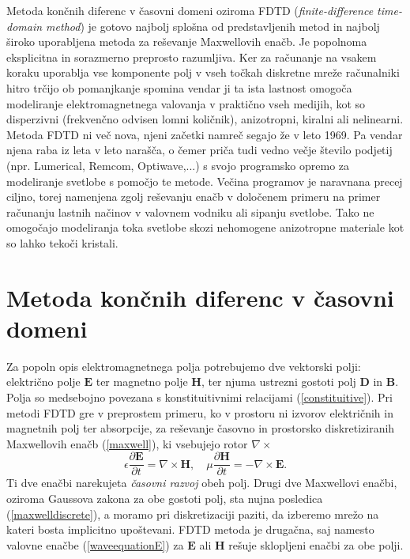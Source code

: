 \documentclass[longbibliography,slovene,a4paper,12pt]{book}
\begin{document}
Metoda končnih diferenc v časovni domeni oziroma FDTD (\emph{finite-difference time-domain method}) je gotovo najbolj splošna od predstavljenih metod in najbolj široko uporabljena metoda za reševanje Maxwellovih enačb. Je popolnoma eksplicitna in sorazmerno preprosto razumljiva. Ker za računanje na vsakem koraku uporablja vse komponente polj v vseh točkah diskretne mreže računalniki hitro trčijo ob pomanjkanje spomina vendar ji ta ista lastnost omogoča modeliranje elektromagnetnega valovanja v praktično vseh medijih, kot so disperzivni (frekvenčno odvisen lomni količnik), anizotropni, kiralni ali nelinearni\cite{gedney}.\\

Metoda FDTD ni več nova, njeni začetki namreč segajo že v leto 1969. Pa vendar njena raba iz leta v leto narašča, o čemer priča tudi vedno večje število podjetij (npr. Lumerical, Remcom, Optiwave,...) s svojo programsko opremo za modeliranje svetlobe s pomočjo te metode\cite{gedney}. Večina programov je naravnana precej ciljno, torej namenjena zgolj reševanju enačb v določenem primeru na primer računanju lastnih načinov v valovnem vodniku ali sipanju svetlobe. Tako ne omogočajo modeliranja toka svetlobe skozi nehomogene anizotropne materiale kot so lahko tekoči kristali.


\section{Metoda končnih diferenc v časovni domeni}

Za popoln opis elektromagnetnega polja potrebujemo dve vektorski polji: električno polje $\mathbf{E}$ ter magnetno polje $\mathbf{H}$, ter njuma ustrezni gostoti polj $\mathbf{D}$ in $\mathbf{B}$. Polja so medsebojno povezana s konstituitivnimi relacijami (\ref{constituitive}). Pri metodi FDTD gre v preprostem primeru, ko v prostoru ni izvorov električnih in magnetnih polj ter absorpcije, za reševanje časovno in prostorsko diskretiziranih Maxwellovih enačb (\ref{maxwell}), ki vsebujejo rotor $\nabla \times$
\begin{equation}
\epsilon \frac{\partial \mathbf{E}}{\partial t} = \nabla \times \mathbf{H}, \quad \mu \frac{\partial \mathbf{H}}{\partial t} = - \nabla \times \mathbf{E}.
\label{maxwelldiscrete}
\end{equation}
Ti dve enačbi narekujeta \emph{časovni razvoj} obeh polj. Drugi dve Maxwellovi enačbi, oziroma Gaussova zakona za obe gostoti polj, sta nujna posledica (\ref{maxwelldiscrete}), a moramo pri diskretizaciji paziti, da izberemo mrežo na kateri bosta implicitno upoštevani. FDTD metoda je drugačna, saj namesto valovne enačbe (\ref{waveequationE}) za $\mathbf{E}$ ali $\mathbf{H}$ rešuje sklopljeni enačbi za obe polji. \\
\end{document}

